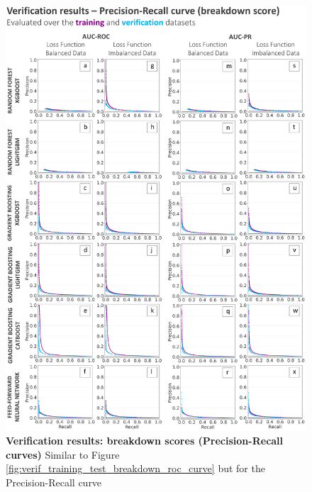 \begin{figure}[htbp]
\centering
\includegraphics[width=\textwidth]{verif_training_test_breakdown_pr_curve.png}
\caption{\textbf{Verification results: breakdown scores (Precision-Recall curves)} Similar to Figure \ref{fig:verif_training_test_breakdown_roc_curve} but for the Precision-Recall curve} 
\label{fig:verif_training_test_breakdown_pr_curve}
\end{figure}

